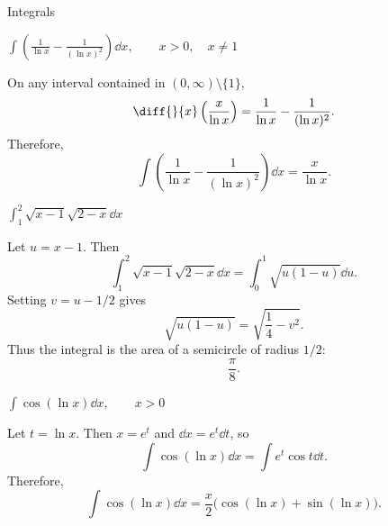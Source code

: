 \begin{expectedproblemgroup}{Integrals}
        \begin{expectedsubproblem}
            \(\displaystyle
                \int\left(\frac{1}{\ln x}-\frac{1}{(\ln x)^2}\right)\dd x,
                \qquad x>0,\quad x\neq1
            \)
        \end{expectedsubproblem}

        \begin{expectedsubsolution}
            On any interval contained in $(0,\infty)\setminus\{1\}$,
            \[
                \diff{}{x}\left(\frac{x}{\ln x}\right)
                =
                \frac{1}{\ln x}
                -
                \frac{1}{(\ln x)^2}.
            \]
            Therefore,
            \[
                \boxed{
                    \int
                    \left(
                        \frac{1}{\ln x}
                        -
                        \frac{1}{(\ln x)^2}
                    \right)\dd x
                    =
                    \frac{x}{\ln x}
                }.
            \]
        \end{expectedsubsolution}

        \begin{expectedsubproblem}
            \(\displaystyle
                \int_1^2\sqrt{x-1}\sqrt{2-x}\dd x
            \)
        \end{expectedsubproblem}

        \begin{expectedsubsolution}
            Let $u=x-1$. Then
            \[
                \int_1^2\sqrt{x-1}\sqrt{2-x}\dd x
                =
                \int_0^1\sqrt{u(1-u)}\dd u.
            \]
            Setting $v=u-1/2$ gives
            \[
                \sqrt{u(1-u)}
                =
                \sqrt{\frac{1}{4}-v^2}.
            \]
            Thus the integral is the area of a semicircle of radius $1/2$:
            \[
                \boxed{\frac{\pi}{8}}.
            \]
        \end{expectedsubsolution}

        \begin{expectedsubproblem}
            \(\displaystyle
                \int\cos(\ln x)\dd x,
                \qquad x>0
            \)
        \end{expectedsubproblem}

        \begin{expectedsubsolution}
            Let $t=\ln x$. Then $x=e^t$ and $\dd x=e^t\dd t$, so
            \[
                \int\cos(\ln x)\dd x
                =
                \int e^t\cos t\dd t.
            \]
            Therefore,
            \[
                \boxed{
                    \int\cos(\ln x)\dd x
                    =
                    \frac{x}{2}
                    \bigl(\cos(\ln x)+\sin(\ln x)\bigr)
                }.
            \]
        \end{expectedsubsolution}


\end{expectedproblemgroup}
